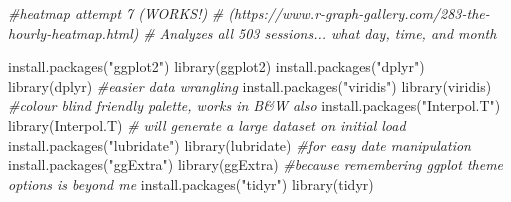 \documentclass[
]{article}
\newenvironment{Shaded}{\begin{snugshade}}{\end{snugshade}}
\newcommand{\CommentTok}[1]{\textcolor[rgb]{0.56,0.35,0.01}{\textit{#1}}}
\newcommand{\FunctionTok}[1]{\textcolor[rgb]{0.00,0.00,0.00}{#1}}
\newcommand{\NormalTok}[1]{#1}
\newcommand{\StringTok}[1]{\textcolor[rgb]{0.31,0.60,0.02}{#1}}
\begin{document}
\begin{Shaded}
\begin{Highlighting}[]
\CommentTok{\#heatmap attempt 7 (WORKS!)}
\CommentTok{\# (https://www.r{-}graph{-}gallery.com/283{-}the{-}hourly{-}heatmap.html)}
\CommentTok{\# Analyzes all 503 sessions... what day, time, and month }

\FunctionTok{install.packages}\NormalTok{(}\StringTok{"ggplot2"}\NormalTok{)}
\FunctionTok{library}\NormalTok{(ggplot2)}
\FunctionTok{install.packages}\NormalTok{(}\StringTok{"dplyr"}\NormalTok{)}
\FunctionTok{library}\NormalTok{(dplyr) }\CommentTok{\#easier data wrangling }
\FunctionTok{install.packages}\NormalTok{(}\StringTok{"viridis"}\NormalTok{)}
\FunctionTok{library}\NormalTok{(viridis) }\CommentTok{\#colour blind friendly palette, works in B\&W also}
\FunctionTok{install.packages}\NormalTok{(}\StringTok{"Interpol.T"}\NormalTok{)}
\FunctionTok{library}\NormalTok{(Interpol.T) }\CommentTok{\# will generate a large dataset on initial load}
\FunctionTok{install.packages}\NormalTok{(}\StringTok{"lubridate"}\NormalTok{)}
\FunctionTok{library}\NormalTok{(lubridate) }\CommentTok{\#for easy date manipulation}
\FunctionTok{install.packages}\NormalTok{(}\StringTok{"ggExtra"}\NormalTok{)}
\FunctionTok{library}\NormalTok{(ggExtra) }\CommentTok{\#because remembering ggplot theme options is beyond me}
\FunctionTok{install.packages}\NormalTok{(}\StringTok{"tidyr"}\NormalTok{)}
\FunctionTok{library}\NormalTok{(tidyr) }


\end{Highlighting}
\end{Shaded}
\end{document}
